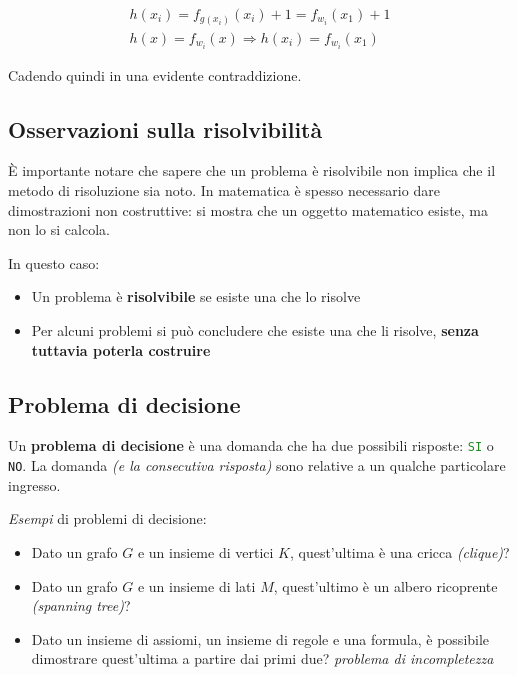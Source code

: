 \documentclass[italian, 10pt]{article}
\begin{document}
\begin{align*}
  h(x_i) = f_{g(x_i)}(x_i) + 1 = f_{w_i}(x_1) + 1 \\
  h(x) = f_{w_i}(x) \Rightarrow h(x_i) = f_{w_i}(x_1)
\end{align*}

Cadendo quindi in una evidente contraddizione.

\subsection{Osservazioni sulla risolvibilità}

È importante notare che sapere che un problema è risolvibile non implica che il metodo di risoluzione sia noto.
In matematica è spesso necessario dare dimostrazioni non costruttive: si mostra che un oggetto matematico esiste, ma non lo si calcola.

In questo caso:
\begin{itemize}
  \item Un problema è \textbf{risolvibile} se esiste una \TM che lo risolve
  \item Per alcuni problemi si può concludere che esiste una \TM che li risolve, \textbf{senza tuttavia poterla costruire}
\end{itemize}

\subsection{Problema di decisione}

Un \textbf{problema di decisione} è una domanda che ha due possibili risposte: \textcolor{ForestGreen}{\texttt{SI}} o \textcolor{BrickRed}{\texttt{NO}}.
La domanda \textit{(e la consecutiva risposta)} sono relative a un qualche particolare ingresso.

\bigskip
\textit{Esempi} di problemi di decisione:
\begin{itemize}
  \item Dato un grafo \(G\) e un insieme di vertici \(K\), quest'ultima è una cricca \textit{(clique)}?
  \item Dato un grafo \(G\) e un insieme di lati \(M\), quest'ultimo è un albero ricoprente \textit{(spanning tree)}?
  \item Dato un insieme di assiomi, un insieme di regole e una formula, è possibile dimostrare quest'ultima a partire dai primi due? \textit{problema di incompletezza}
\end{itemize}
\end{document}
